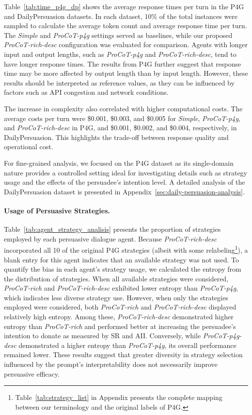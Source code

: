 \documentclass[11pt]{article}
\begin{document}

Table~\ref{tab:time_p4g_dp} shows the average response times per turn in the P4G and DailyPersuasion datasets.
In each dataset, 10\% of the total instances were sampled to calculate the average token count and average response time per turn.
The \textit{Simple} and \textit{ProCoT-p4g} settings served as baselines, while our proposed \textit{ProCoT-rich-desc} configuration was evaluated for comparison.
Agents with longer input and output lengths, such as \textit{ProCoT-p4g} and \textit{ProCoT-rich-desc}, tend to have longer response times.
The results from P4G further suggest that response time may be more affected by output length than by input length.
However, these results should be interpreted as reference values, as they can be influenced by factors such as API congestion and network conditions.

The increase in complexity also correlated with higher computational costs. 
The average costs per turn were \$0.001, \$0.003, and \$0.005 for \textit{Simple}, \textit{ProCoT-p4g}, and \textit{ProCoT-rich-desc} in P4G, and \$0.001, \$0.002, and \$0.004, respectively, in DailyPersuasion.
This highlights the trade-off between response quality and operational cost.

For fine-grained analysis, we focused on the P4G dataset as its single-domain nature provides a controlled setting ideal for investigating details such as strategy usage and the effects of the persuadee's intention level. 
A detailed analysis of the DailyPersuasion dataset is presented in Appendix~\ref{sec:daily-persuasion-analysis}.

\paragraph{Usage of Persuasive Strategies.}

Table~\ref{tab:agent_strategy_analisis} presents the proportion of strategies employed by each persuasive dialogue agent.
Because \textit{ProCoT-rich-desc} incorporated all 10 of the original P4G strategies (albeit with some relabeling\footnote{Table~\ref{tab:strategy_list} in Appendix presents the complete mapping between our terminology and the original labels of P4G.}), a blank entry for this agent indicates that an available strategy was not used. 
To quantify the bias in each agent's strategy usage, we calculated the entropy from the distribution of strategies.
When all available strategies were considered, \textit{ProCoT-rich} and \textit{ProCoT-rich-desc} exhibited lower entropy than \textit{ProCoT-p4g}, which indicates less diverse strategy use.
However, when only the strategies employed were considered, both \textit{ProCoT-rich} and \textit{ProCoT-rich-desc} displayed relatively high entropy.
Among these, \textit{ProCoT-rich-desc} demonstrated higher entropy than \textit{ProCoT-rich} and performed better at increasing the persuadee's intention to donate as measured by SR and AII. 
Conversely, while \textit{ProCoT-p4g-desc} demonstrated a higher entropy than \textit{ProCoT-p4g}, its overall performance remained lower. 
These results suggest that greater diversity in strategy selection influenced by the prompt's interpretability does not necessarily improve persuasive efficacy.
\end{document}

